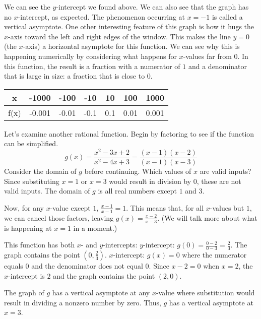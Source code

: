 We can see the \( y \)-intercept we found above. We can also see that the graph has no \( x \)-intercept, as expected. The phenomenon occurring at \( x = -1 \) is called a vertical asymptote. One other interesting feature of this graph is how it hugs the \( x \)-axis toward the left and right edges of the window. This makes the line \( y = 0 \) (the \( x \)-axis) a horizontal asymptote for this function. We can see why this is happening numerically by considering what happens for \( x \)-values far from \( 0 \). In this function, the result is a fraction with a numerator of \( 1 \) and a denominator that is large in size: a fraction that is close to \( 0 \).

\begin{center}
\begin{tabular}{ |c|c|c|c|c|c|c| } 
 \hline
 x & -1000 & -100 & -10 & 10 & 100 & 1000 \\ 
 \hline
 f(x) & -0.001 & -0.01 & -0.1 & 0.1 & 0.01 & 0.001 \\ 
 \hline
\end{tabular}
\end{center}

Let's examine another rational function. Begin by factoring to see if the function can be simplified.
\[ g(x) = \frac{x^2 - 3x + 2}{x^2 - 4x + 3} = \frac{(x - 1)(x - 2)}{(x - 1)(x - 3)} \]
Consider the domain of \( g \) before continuing. Which values of \( x \) are valid inputs? Since substituting \( x = 1 \) or \( x = 3 \) would result in division by \( 0 \), these are not valid inputs. The domain of \( g \) is all real numbers except \( 1 \) and \( 3 \).

Now, for any \( x \)-value except \( 1 \), \( \frac{x-1}{x-1} = 1 \). This means that, for all \( x \)-values but \(1\), we can cancel those factors, leaving \( g(x) = \frac{x-2}{x-3} \). (We will talk more about what is happening at \( x = 1 \) in a moment.)

This function has both \( x \)- and \( y \)-intercepts:
\( y \)-intercept: \( g(0) = \frac{0-2}{0-3} = \frac{2}{3} \). The graph contains the point \( (0, \frac{2}{3}) \).
\( x \)-intercept: \( g(x) = 0 \) where the numerator equals \( 0 \) and the denominator does not equal \( 0 \). Since \( x - 2 = 0 \) when \( x = 2 \), the \( x \)-intercept is \( 2 \) and the graph contains the point \( (2, 0) \).

The graph of \( g \) has a vertical asymptote at any \( x \)-value where substitution would result in dividing a nonzero number by zero. Thus, \( g \) has a vertical asymptote at \( x = 3 \).

